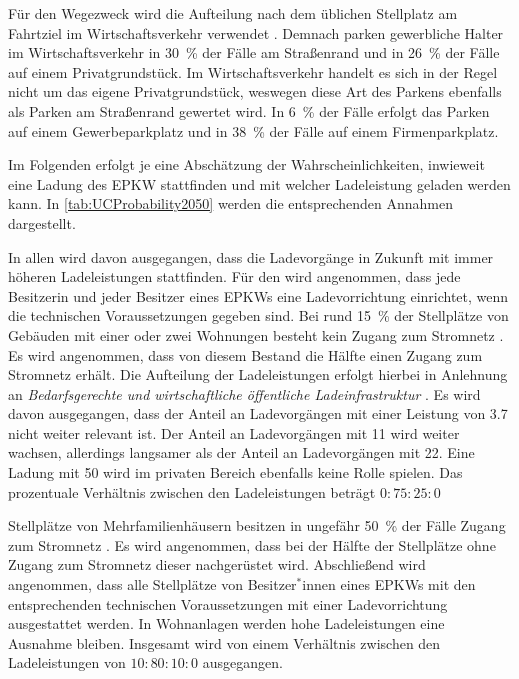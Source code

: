 Für den Wegezweck \dienst wird die Aufteilung nach dem üblichen Stellplatz am Fahrtziel im Wirtschaftsverkehr verwendet \cite{Rikus2015}.
Demnach parken gewerbliche Halter im Wirtschaftsverkehr in \SI{30}{\percent} der Fälle am Straßenrand und in \SI{26}{\percent} der Fälle auf einem Privatgrundstück.
Im Wirtschaftsverkehr handelt es sich in der Regel nicht um das eigene Privatgrundstück, weswegen diese Art des Parkens ebenfalls als Parken am Straßenrand gewertet wird.
In \SI{6}{\percent} der Fälle erfolgt das Parken auf einem Gewerbeparkplatz und in \SI{38}{\percent} der Fälle auf einem Firmenparkplatz.\medskip

Im Folgenden erfolgt je \UC eine Abschätzung der Wahrscheinlichkeiten, inwieweit eine Ladung des \gls{EPKW} stattfinden und mit welcher Ladeleistung geladen werden kann.
In \autoref{tab:UCProbability2050} werden die entsprechenden Annahmen dargestellt.



In allen \UCs wird davon ausgegangen, dass die Ladevorgänge in Zukunft mit immer höheren Ladeleistungen stattfinden.
Für den \UC \Eigenheim wird angenommen, dass jede Besitzerin und jeder Besitzer eines \glspl{EPKW} eine Ladevorrichtung einrichtet, wenn die technischen Voraussetzungen gegeben sind.
Bei rund \SI{15}{\percent} der Stellplätze von Gebäuden mit einer oder zwei Wohnungen besteht kein Zugang zum Stromnetz \cite{dena2020}.
Es wird angenommen, dass von diesem Bestand die Hälfte einen Zugang zum Stromnetz erhält.
Die Aufteilung der Ladeleistungen erfolgt hierbei in Anlehnung an \textit{Bedarfsgerechte und wirtschaftliche öffentliche Ladeinfrastruktur} \cite{NPZMAVE2020}.
Es wird davon ausgegangen, dass der Anteil an Ladevorgängen mit einer Leistung von \SI{3.7}{\kw} nicht weiter relevant ist.
Der Anteil an Ladevorgängen mit \SI{11}{\kw} wird weiter wachsen, allerdings langsamer als der Anteil an Ladevorgängen mit \SI{22}{\kw}.
Eine Ladung mit \SI{50}{\kw} wird im privaten Bereich ebenfalls keine Rolle spielen.
Das prozentuale Verhältnis zwischen den Ladeleistungen beträgt \(0:75:25:0\)\medskip

Stellplätze von Mehrfamilienhäusern besitzen in ungefähr \SI{50}{\percent} der Fälle Zugang zum Stromnetz \cite{dena2020}.
Es wird angenommen, dass bei der Hälfte der Stellplätze ohne Zugang zum Stromnetz dieser nachgerüstet wird.
Abschließend wird angenommen, dass alle Stellplätze von Besitzer$^*$innen eines \glspl{EPKW} mit den entsprechenden technischen Voraussetzungen mit einer Ladevorrichtung ausgestattet werden.
In Wohnanlagen werden hohe Ladeleistungen eine Ausnahme bleiben.
Insgesamt wird von einem Verhältnis zwischen den Ladeleistungen von \(10:80:10:0\) ausgegangen.\medskip

